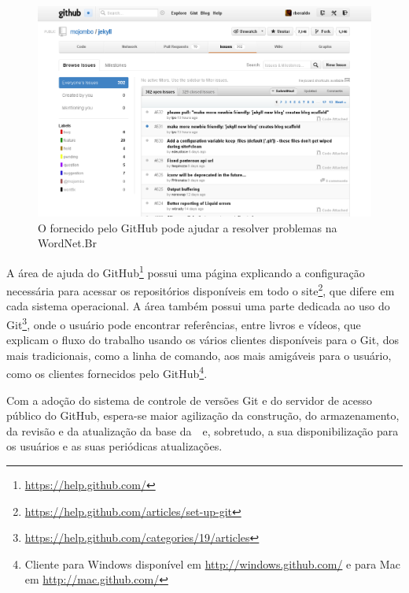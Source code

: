 \begin{figure}[h]
  \centering
  \includegraphics[width=.9\textwidth]{img/bugtracker.png}
  \caption{O  fornecido pelo GitHub pode ajudar a resolver problemas na WordNet.Br}
  \label{github:bugtracker}
\end{figure}

A área de ajuda do GitHub\footnote{\url{https://help.github.com/}} possui uma
página explicando a configuração necessária para acessar os repositórios
disponíveis em todo o
site\footnote{\url{https://help.github.com/articles/set-up-git}}, que difere em
cada sistema operacional. A área também possui uma parte dedicada ao uso do
Git\footnote{\url{https://help.github.com/categories/19/articles}}, onde o
usuário pode encontrar referências, entre livros e vídeos, que explicam o fluxo
do trabalho usando os vários clientes disponíveis para o Git, dos mais
tradicionais, como a linha de comando, aos mais amigáveis para o usuário, como
os clientes fornecidos pelo GitHub\footnote{Cliente para Windows disponível em
\url{http://windows.github.com/} e para Mac em \url{http://mac.github.com/}}.

Com a adoção do sistema de controle de versões Git e do servidor de acesso
público do GitHub, espera-se maior agilização da construção, do armazenamento,
da revisão e da atualização da base da~\wnbr\ e, sobretudo, a sua
disponibilização para os usuários e as suas periódicas atualizações.
